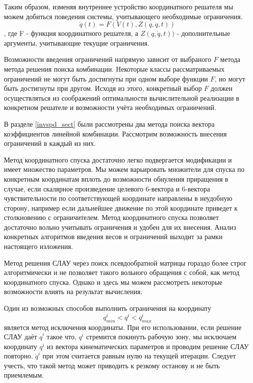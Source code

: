 \documentclass[12pt,a4paper,titlepage]{article}
\begin{document}
Таким образом, изменяя внутреннее устройство координатного решателя мы можем добиться поведения системы, учитывающего необходимые ограничения.
\begin{equation}
\dot{q}(t) = F(V(t), Z(q,\dot{q},t)) 
\end{equation}, где F - функция координатного решателя, а $Z(q,\dot{q},t))$ - дополнительные аргументы, учитывающие текущие ограничения.   

Возможности введения ограничений напрямую зависит от выбраного $F$ метода метода решения поиска комбинации. Некоторые классы рассматриваемых ограничений не могут быть достигнуты при одном выборе функции $F$, но могут быть достигнуты при другом. Исходя из этого, конкретный выбор $F$ должен осуществляться из соображений оптимальности вычислительной реализации в конкретном решателе и возможности учёта необходимых ограничений.

В разделе \ref{invspd_sect} были рассмотрены два метода поиска вектора коэффициентов линейной комбинации. Рассмотрим возможность внесения ограничений в каждый из них.

Метод координатного спуска достаточно легко подвергается модификации и имеет множество параметров. Мы можем варьировать множители для спуска по конкретным координатам вплоть до возможности обнуления приращения в случае, если скалярное произведение целевого 6-вектора и 6-вектора чувствительности по соответствующей координате направлены в неудобную сторону, например если дальнейшее движение по этой координате приведет к столкновению с ограничителем. Метод координатного спуска позволяет достаточно вольно учитывать ограничения и удобен для их внесения. Анализ конкретных алгоритмов введения весов и ограничений выходит за рамки настоящего изложения. 

Метод решения СЛАУ через поиск псевдообратной матрицы гораздо более строг алгоритмически и не позволяет такого вольного обращения с собой, как метод координатного спуска. Однако и здесь мы можем рассмотреть некоторые возможности влиять на результат вычисления.

Один из возможных способов выполнить ограничения на координату
\begin{equation}
q^i_{min} < q^i < q^i_{max} 
\end{equation} является метод исключения координаты. При его использовании, если решение СЛАУ даёт $\dot{q}^i$ такое что, $q^i$ стремится покинуть рабочую зону, мы исключаем координату $q^i$ из вектора кинематических параметров и проводим решение СЛАУ повторно. $\dot{q}^i$ при этом считается равным нулю на текущей итерации. Следует учесть, что такой метод может приводить к резкому останову и не быть приемлемым.
\end{document}
